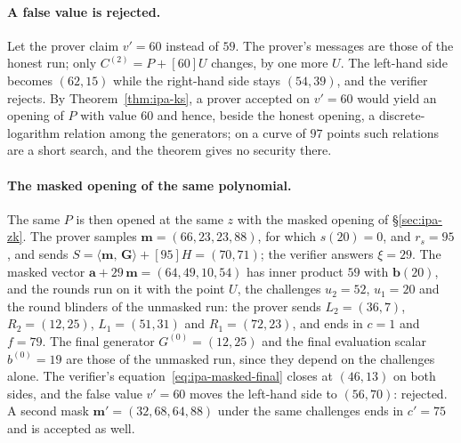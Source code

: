 \documentclass[11pt,a4paper]{article}
\theoremstyle{definition}
\newcommand{\ip}[2]{\langle #1,\, #2 \rangle}
\begin{document}
\paragraph{A false value is rejected.}
Let the prover claim $v' = 60$ instead of $59$. The prover's messages
are those of the honest run; only $C^{(2)} = P + [60]U$ changes, by one
more $U$. The left-hand side becomes $(62, 15)$ while the right-hand
side stays $(54, 39)$, and the verifier rejects. By
Theorem~\ref{thm:ipa-ks}, a prover accepted on $v' = 60$ would yield an
opening of $P$ with value $60$ and hence, beside the honest opening, a
discrete-logarithm relation among the generators; on a curve of $97$
points such relations are a short search, and the theorem gives no
security there.

\paragraph{The masked opening of the same polynomial.}
The same $P$ is then opened at the same $z$ with the masked opening of
\S\ref{sec:ipa-zk}. The prover samples $\mathbf m = (66, 23, 23, 88)$,
for which $s(20) = 0$, and $r_s = 95$, and sends
$S = \ip{\mathbf m}{\mathbf G} + [95]H = (70, 71)$; the verifier answers
$\xi = 29$. The masked vector $\mathbf a + 29\,\mathbf m = (64, 49, 10,
54)$ has inner product $59$ with $\mathbf b(20)$, and the rounds run on
it with the point $U$, the challenges $u_2 = 52$, $u_1 = 20$ and the
round blinders of the unmasked run: the prover sends $L_2 = (36, 7)$,
$R_2 = (12, 25)$, $L_1 = (51, 31)$ and $R_1 = (72, 23)$, and ends in
$c = 1$ and $f = 79$. The final generator $G^{(0)} = (12, 25)$ and the
final evaluation scalar $b^{(0)} = 19$ are those of the unmasked run,
since they depend on the challenges alone. The verifier's
equation~\eqref{eq:ipa-masked-final} closes at $(46, 13)$ on both sides,
and the false value $v' = 60$ moves the left-hand side to $(56, 70)$:
rejected. A second mask $\mathbf m' = (32, 68, 64, 88)$ under the same
challenges ends in $c' = 75$ and is accepted as well.
\end{document}
